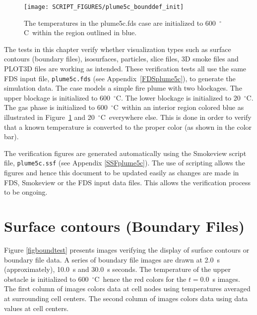 \documentclass[11pt,twoside]{book}
\newcommand{\degC}{$^\circ$C}
\newcommand{\figoptions}{hbp}
\begin{document}
\begin{figure}[\figoptions]
\begin{center}
\texttt{[image: SCRIPT\_FIGURES/plume5c\_bounddef\_init]}
\end{center}
 \caption{The temperatures in the plume5c.fds case are initialized to 600~\degC\ within
 the region outlined in blue.
 }
\label{figbounddef}%
\end{figure}

The tests in this chapter verify whether visualization types such
as surface contours (boundary files), isosurfaces, particles,
slice files, 3D smoke files and PLOT3D files are working as
intended.  These verification tests all use the same FDS input
file, {\tt plume5c.fds} (see Appendix~\ref{FDSplume5c}), to
generate the simulation data.  The case models a simple fire plume
with two blockages.  The upper blockage is initialized to
600~\degC.   The lower blockage is initialized to 20~\degC.  The
gas phase is initialized to 600~\degC\ within an interior region
colored blue as illustrated in Figure~\ref{figbounddef} and
20~\degC\ everywhere else.  This is done in order to verify that a
known temperature is converted to the proper color (as shown in
the color bar).

The verification figures are generated automatically using the
Smokeview script file, {\tt plume5c.ssf} (see Appendix
\ref{SSFplume5c}).  The use of scripting allows the figures and
hence this document to be updated easily as changes are made in
FDS, Smokeview or the FDS input data files.  This allows the
verification process to be ongoing.

\clearpage



\section{Surface contours (Boundary Files)}
Figure \ref{figboundtest} presents images verifying the display of
surface contours or boundary file data. A series of boundary file
images are drawn at 2.0~s (approximately), 10.0~s and 30.0~s
seconds. The temperature of the upper obstacle is initialized to
600~\degC\ hence the red colors for the $t=0.0$~s images. The
first column of images colors data at cell nodes using
temperatures averaged at surrounding cell centers.  The second
column of images colors data using data values at cell centers.
\end{document}
